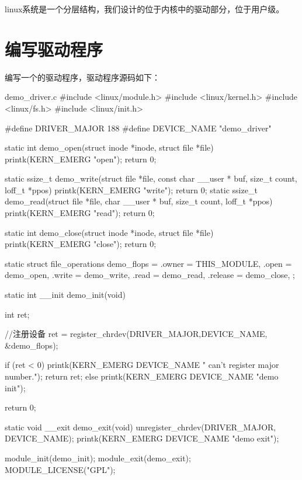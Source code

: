 \documentclass[lang=cn,newtx,10pt,scheme=chinese]{elegantbook}
\begin{document}
linux系统是一个分层结构，我们设计的位于内核中的驱动部分，位于用户级。

\section{编写驱动程序}

编写一个的驱动程序，驱动程序源码如下：

\begin{mycode}{demo\_driver.c}
#include <linux/module.h>
#include <linux/kernel.h>
#include <linux/fs.h>
#include <linux/init.h>

#define    DRIVER_MAJOR     188
#define    DEVICE_NAME     "demo_driver"

static int demo_open(struct inode *inode, struct file *file)
{    
    printk(KERN_EMERG "open\n");
    return 0;
}

static ssize_t demo_write(struct file *file, const char __user * buf, size_t count, loff_t *ppos)
{
    printk(KERN_EMERG "write\n");
    return 0;
}
static ssize_t demo_read(struct file *file,  char __user * buf, size_t count, loff_t *ppos)
{
    printk(KERN_EMERG "read\n");  
    return 0;
}

static int demo_close(struct inode *inode, struct file *file)
{
    printk(KERN_EMERG "close\n");
    return 0;
}

static struct file_operations demo_flops = 
{
    .owner  =   THIS_MODULE,
    .open   =   demo_open,     
    .write  =   demo_write,
    .read     =      demo_read,
    .release =  demo_close,
};

static int __init demo_init(void)
{
    int ret;
         
    //注册设备
    ret = register_chrdev(DRIVER_MAJOR,DEVICE_NAME, &demo_flops);

    if (ret < 0) 
    {
      printk(KERN_EMERG DEVICE_NAME " can't register major number.\n");
      return ret;
    }
    else
    {
        printk(KERN_EMERG DEVICE_NAME "demo init\n");
    }

    return 0;
}

static void __exit demo_exit(void)
{
    unregister_chrdev(DRIVER_MAJOR, DEVICE_NAME);
    printk(KERN_EMERG DEVICE_NAME "demo exit\n");
}

module_init(demo_init);
module_exit(demo_exit);
MODULE_LICENSE("GPL");
\end{mycode}
\end{document}
